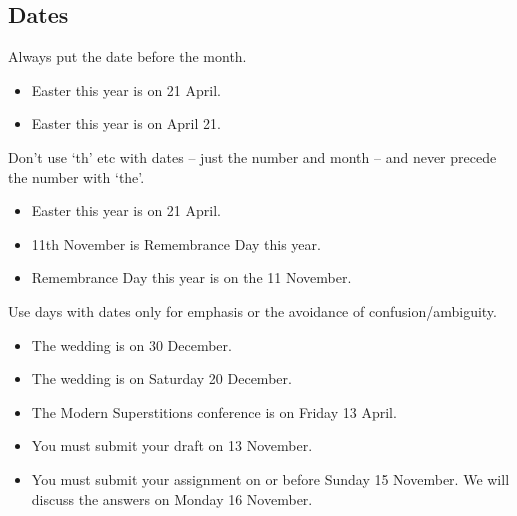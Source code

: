 \documentclass[11pt,a4paper]{book}
\newcommand{\xmark}{{\color{cadmiumred}\ding{54}}}%
\newcommand{\cmark}{{\color{green(html/cssgreen)}\checkmark}}%
\begin{document}
			\subsection{Dates}
			Always put the date before the month.
			{\firasans \begin{mdframed}[backgroundcolor=aliceblue] \begin{itemize}[label=\cmark]
				\item Easter this year is on 21 April.
				\item[\xmark] Easter this year is on April 21.
			\end{itemize} \end{mdframed} }
			Don't use `th' etc with dates -- just the number and month -- and never precede the number with `the'.
			{\firasans \begin{mdframed}[backgroundcolor=aliceblue] \begin{itemize}[label=\cmark]
				\item Easter this year is on 21 April.
				\item[\xmark] 11th November is Remembrance Day this year.
				\item[\xmark] Remembrance Day this year is on the 11 November.
			\end{itemize} \end{mdframed} }
			Use days with dates only for emphasis or the avoidance of confusion/ambiguity. 
			{\firasans \begin{mdframed}[backgroundcolor=aliceblue] \begin{itemize}[label=\cmark]
				\item The wedding is on 30 December.
				\item[\xmark] The wedding is on Saturday 20 December.
				\item The Modern Superstitions conference is on Friday 13 April.
				\item You must submit your draft on 13 November.
				\item You must submit your assignment on or before Sunday 15 November. We will discuss the answers on Monday 16 November.
			\end{itemize} \end{mdframed} }
\end{document}
